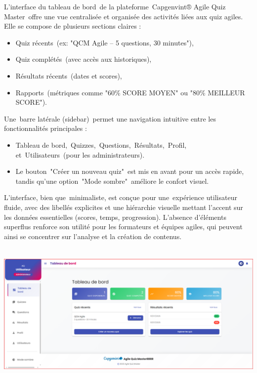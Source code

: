 \documentclass[12pt,a4paper,twoside]{report}
\begin{document}
L'interface du tableau de bord~de la plateforme~Capgenvint® Agile Quiz
Master~offre une vue centralisée et organisée des activités liées aux
quiz agiles. Elle se compose de plusieurs sections claires :

\begin{itemize}
\item
  Quiz récents~(ex: "QCM Agile -- 5 questions, 30 minutes"),
\item
  Quiz complétés~(avec accès aux historiques),
\item
  Résultats récents~(dates et scores),
\item
  Rapports~(métriques comme "60\% SCORE MOYEN" ou "80\% MEILLEUR
  SCORE").
\end{itemize}

Une~barre latérale (sidebar)~permet une navigation intuitive entre les
fonctionnalités principales :

\begin{itemize}
\item
  Tableau de bord,~Quizzes,~Questions,~Résultats,~Profil,
  et~Utilisateurs~(pour les administrateurs).
\item
  Le bouton~"Créer un nouveau quiz"~est mis en avant pour un accès
  rapide, tandis qu'une option~"Mode sombre"~améliore le confort visuel.
\end{itemize}

L'interface, bien que~minimaliste, est conçue pour une~expérience
utilisateur fluide, avec des libellés explicites et une hiérarchie
visuelle mettant l'accent sur les données essentielles (scores, temps,
progression). L'absence d'éléments superflus renforce son utilité pour
les formateurs et équipes agiles, qui peuvent ainsi se concentrer sur
l'analyse et la création de contenus.

\includegraphics[width=6.3in,height=2.77986in]{latex_media/media/image52.png}
\end{document}
